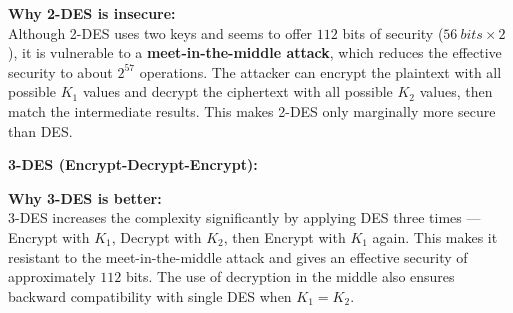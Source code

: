 \documentclass{article}
\begin{document}
\vspace{0.5cm}
\textbf{Why 2-DES is insecure:} \\
Although 2-DES uses two keys and seems to offer $112$ bits of security ($56 \ bits \times 2$), it is vulnerable to a \textbf{meet-in-the-middle attack}, which reduces the effective security to about $2^{57}$ operations. The attacker can encrypt the plaintext with all possible $K_1$ values and decrypt the ciphertext with all possible $K_2$ values, then match the intermediate results. This makes 2-DES only marginally more secure than DES.

\vspace{0.7cm}
\textbf{3-DES (Encrypt-Decrypt-Encrypt):}
\vspace{0.3cm}


\vspace{0.5cm}
\textbf{Why 3-DES is better:} \\
3-DES increases the complexity significantly by applying DES three times — Encrypt with $K_1$, Decrypt with $K_2$, then Encrypt with $K_1$ again. This makes it resistant to the meet-in-the-middle attack and gives an effective security of approximately $112$ bits. The use of decryption in the middle also ensures backward compatibility with single DES when $K_1 = K_2$.
\end{document}
